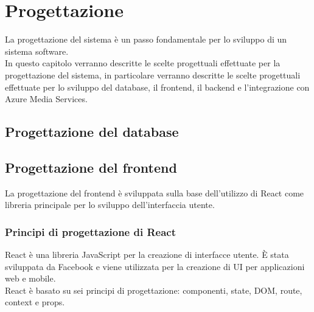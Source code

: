 \chapter{Progettazione}
\label{cap:progettazione}

La progettazione del sistema è un passo fondamentale per lo sviluppo di un sistema software.\\
In questo capitolo verranno descritte le scelte progettuali effettuate per la progettazione del sistema, in particolare verranno descritte le scelte progettuali effettuate per lo sviluppo del database, il frontend, il backend e l'integrazione con Azure Media Services.\\



\section{Progettazione del database}

\section{Progettazione del frontend}
La progettazione del frontend è sviluppata sulla base dell'utilizzo di React come libreria principale per lo sviluppo dell'interfaccia utente.
\subsection{Principi di progettazione di React}
React è una libreria JavaScript per la creazione di interfacce utente. È stata sviluppata da Facebook e viene utilizzata per la creazione di UI per applicazioni web e mobile.\\
React è basato su sei principi di progettazione: componenti, state, DOM, route, context e props.\\
